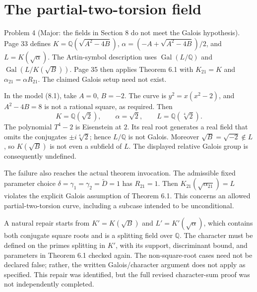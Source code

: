 \documentclass[10pt]{article}
\begin{document}
\section*{The partial-two-torsion field}
Problem 4 (Major: the fields in Section 8 do not meet the Galois hypothesis).  Page 33 defines \(K=\mathbb Q(\sqrt{A^2-4B})\), \(\alpha=(-A+\sqrt{A^2-4B})/2\), and \(L=K(\sqrt\alpha)\). The Artin-symbol description uses \(\operatorname{Gal}(L/\mathbb Q)\) and \(\operatorname{Gal}(L/K(\sqrt B))\). Page 35 then applies Theorem 6.1 with \(K_{21}=K\) and \(\alpha_{21}=\alpha R_{21}\). The claimed Galois setup need not exist.\par
In the model (8.1), take \(A=0\), \(B=-2\). The curve is \(y^2=x(x^2-2)\), and \(A^2-4B=8\) is not a rational square, as required. Then \[K=\mathbb Q(\sqrt2),\qquad \alpha=\sqrt2,\qquad
 L=\mathbb Q(\sqrt[4]2).\] The polynomial \(T^4-2\) is Eisenstein at \(2\). Its real root generates a real field that omits the conjugates \(\pm i\sqrt[4]2\); hence \(L/\mathbb Q\) is not Galois. Moreover \(\sqrt B=\sqrt{-2}\notin L\), so \(K(\sqrt B)\) is not even a subfield of \(L\). The displayed relative Galois group is consequently undefined.\par
The failure also reaches the actual theorem invocation. The admissible fixed parameter choice \(\delta=\gamma_1=\gamma_2=\widetilde D=1\) has \(R_{21}=1\). Then \(K_{21}(\sqrt{\alpha_{21}})=L\) violates the explicit Galois assumption of Theorem 6.1. This concerns an allowed partial-two-torsion curve, including a subcase intended to be unconditional.\par
A natural repair starts from \(K'=K(\sqrt B)\) and \(L'=K'(\sqrt\alpha)\), which contains both conjugate square roots and is a splitting field over \(\mathbb Q\). The character must be defined on the primes splitting in \(K'\), with its support, discriminant bound, and parameters in Theorem 6.1 checked again. The non-square-root cases need not be declared false; rather, the written Galois/character argument does not apply as specified. This repair was identified, but the full revised character-sum proof was not independently completed.\par
\end{document}
